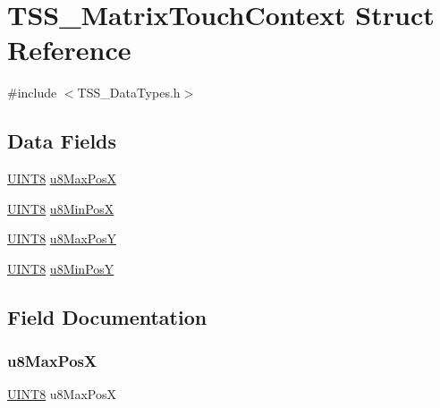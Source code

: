 \hypertarget{struct_t_s_s___matrix_touch_context}{}\section{T\+S\+S\+\_\+\+Matrix\+Touch\+Context Struct Reference}
\label{struct_t_s_s___matrix_touch_context}


{\ttfamily \#include $<$T\+S\+S\+\_\+\+Data\+Types.\+h$>$}

\subsection*{Data Fields}
\begin{DoxyCompactItemize}
\item 
\hyperlink{_t_s_s___data_types_8h_ab27e9918b538ce9d8ca692479b375b6a}{U\+I\+N\+T8} \hyperlink{struct_t_s_s___matrix_touch_context_a2a86b22ce9f9395e47e70f6ed1005e11}{u8\+Max\+PosX}
\item 
\hyperlink{_t_s_s___data_types_8h_ab27e9918b538ce9d8ca692479b375b6a}{U\+I\+N\+T8} \hyperlink{struct_t_s_s___matrix_touch_context_a76f22c0cad51235bc3d3d819eb31742b}{u8\+Min\+PosX}
\item 
\hyperlink{_t_s_s___data_types_8h_ab27e9918b538ce9d8ca692479b375b6a}{U\+I\+N\+T8} \hyperlink{struct_t_s_s___matrix_touch_context_a164bc1471553f9eaf092ddcb9a24c5aa}{u8\+Max\+PosY}
\item 
\hyperlink{_t_s_s___data_types_8h_ab27e9918b538ce9d8ca692479b375b6a}{U\+I\+N\+T8} \hyperlink{struct_t_s_s___matrix_touch_context_a3f2ed92a53d17bdfdb3bfe8092f7cf95}{u8\+Min\+PosY}
\end{DoxyCompactItemize}


\subsection{Field Documentation}
\mbox{\label{struct_t_s_s___matrix_touch_context_a2a86b22ce9f9395e47e70f6ed1005e11}} 
\subsubsection{\texorpdfstring{u8\+Max\+PosX}{u8MaxPosX}}
{\footnotesize\ttfamily \hyperlink{_t_s_s___data_types_8h_ab27e9918b538ce9d8ca692479b375b6a}{U\+I\+N\+T8} u8\+Max\+PosX}

